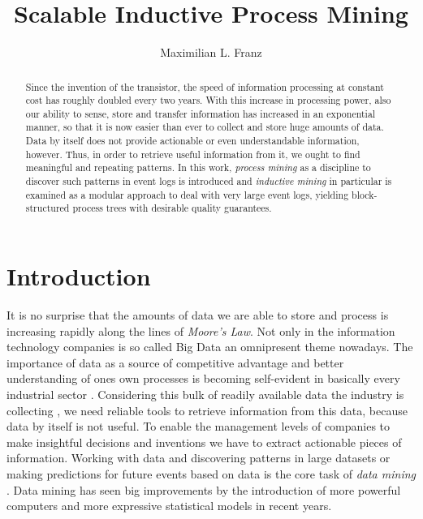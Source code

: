 \documentclass[a4paper]{IEEEtran}
\title{Scalable Inductive Process Mining}
\author{Maximilian L. Franz}
\begin{document}
\theoremstyle{plain}
\newtheorem{thm}{Theorem}[] %

\theoremstyle{definition}
\newtheorem{defn}[thm]{Definition} %
\newtheorem{exmp}[thm]{Example} %


\maketitle

\begin{abstract}
Since the invention of the transistor, the speed of information processing at constant cost has roughly doubled every two years. With this increase in processing power, also our ability to sense, store and transfer information has increased in an exponential manner, so that it is now easier than ever to collect and store huge amounts of data. Data by itself does not provide actionable  or even understandable information, however. Thus, in order to retrieve useful information from it, we ought to find meaningful and repeating patterns.
In this work, \textit{process mining} as a discipline to discover such patterns in event logs is introduced and \textit{inductive mining} in particular is examined as a modular approach to deal with very large event logs, yielding block-structured process trees with desirable quality guarantees.
\end{abstract}

\section{Introduction}
It is no surprise that the amounts of data we are able to store and process is increasing rapidly along the lines of \textit{Moore's Law}. Not only in the information technology companies is so called Big Data an omnipresent theme nowadays. The importance of data as a source of competitive advantage and better understanding of ones own processes is becoming self-evident in basically every industrial sector \cite{manyika2011bigdata}.
Considering this bulk of readily available data the industry is collecting \cite{hilbert2011worldcapacity}, we need reliable tools to retrieve information from this data, because data by itself is not useful. To enable the management levels of companies to make insightful decisions and inventions we have to extract actionable pieces of information. Working with data and discovering patterns in large datasets or making predictions for future events based on data is the core task of \textit{data mining} \cite{DataMiningPrinciples}. Data mining has seen big improvements by the introduction of more powerful computers and more expressive statistical models in recent years.
\end{document}
